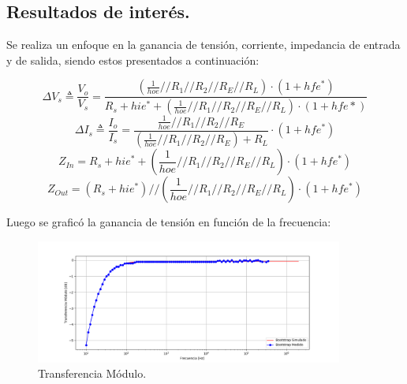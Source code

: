 \subsection{Resultados de interés.}
Se realiza un enfoque en la ganancia de tensión, corriente, impedancia de entrada y de salida, siendo estos presentados a continuación:

\begin{equation}
	\Delta V_s \triangleq \frac{V_o}{V_s} = \frac{ \left(\frac{1}{hoe} // R_1 // R_2 // R_E // R_L  \right)\cdot (1+hfe^*)}{R_s + hie^* + \left(\frac{1}{hoe} // R_1 // R_2 // R_E // R_L  \right)\cdot (1+hfe*) } 
\end{equation}
\begin{equation}
	\Delta I_s \triangleq \frac{I_o}{I_s} =  \frac{\frac{1}{hoe} // R_1 // R_2 // R_E}{(\frac{1}{hoe} // R_1 // R_2 // R_E)+R_L} \cdot (1+hfe^*)
\end{equation}
\begin{equation}
	Z_{In} = R_s + hie^* + \left(\frac{1}{hoe} // R_1 // R_2 // R_E // R_L  \right)\cdot (1+hfe^*)
\end{equation}
\begin{equation}
	Z_{Out} = (R_s + hie^*) //  \left(\frac{1}{hoe} // R_1 // R_2 // R_E // R_L  \right)\cdot (1+hfe^*)
\end{equation}

Luego se graficó la ganancia de tensión en función de la frecuencia:
\begin{figure} [H]
	\centering
	\includegraphics[width=0.9\textwidth]{imagenes/avs.png}
	\caption{Transferencia Módulo.}
	\label{fig:transmod}
\end{figure}

